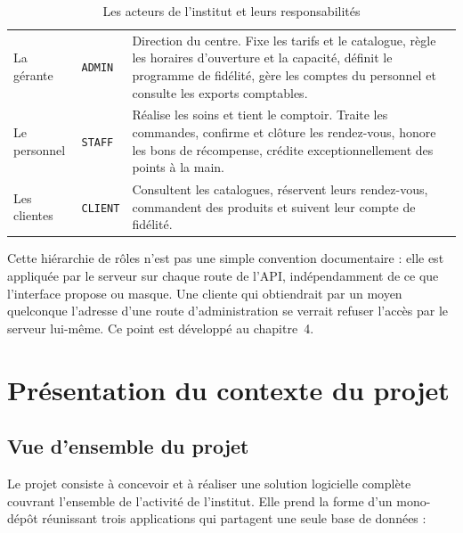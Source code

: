 \begin{table}[H]
\centering
\caption{Les acteurs de l'institut et leurs responsabilités}
\label{tab:acteurs-institut}
\begin{tabularx}{\textwidth}{L{3.1cm} L{2.4cm} X}
\toprule
{} &  &  \\
\midrule
La gérante & \texttt{ADMIN} &
Direction du centre. Fixe les tarifs et le catalogue, règle les horaires
d'ouverture et la capacité, définit le programme de fidélité, gère les comptes
du personnel et consulte les exports comptables. \\

Le personnel & \texttt{STAFF} &
Réalise les soins et tient le comptoir. Traite les commandes, confirme et
clôture les rendez-vous, honore les bons de récompense, crédite
exceptionnellement des points à la main. \\

Les clientes & \texttt{CLIENT} &
Consultent les catalogues, réservent leurs rendez-vous, commandent des
produits et suivent leur compte de fidélité. \\
\bottomrule
\end{tabularx}
\end{table}


Cette hiérarchie de rôles n'est pas une simple convention documentaire : elle
est appliquée par le serveur sur chaque route de l'API, indépendamment de ce
que l'interface propose ou masque. Une cliente qui obtiendrait par un moyen
quelconque l'adresse d'une route d'administration se verrait refuser l'accès
par le serveur lui-même. Ce point est développé au chapitre~4.

\section{Présentation du contexte du projet}

\subsection{Vue d'ensemble du projet}

Le projet consiste à concevoir et à réaliser une solution logicielle complète
couvrant l'ensemble de l'activité de l'institut. Elle prend la forme d'un
mono-dépôt réunissant trois applications qui partagent une seule base de
données :

